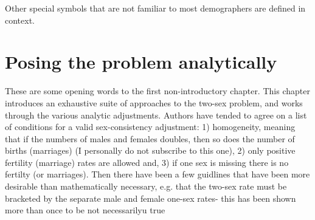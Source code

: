 \documentclass[reqno,12pt,oneside,a4paper]{report} %
\theoremstyle{plain}
\theoremstyle{definition}
\theoremstyle{remark}
\numberwithin{theorem}{chapter}     %
\begin{document}
Other special symbols that are not familiar to most demographers are defined in context.

 \chapter{Posing the problem analytically}
 \label{chap:Posing}
% 
These are some opening words to the first non-introductory chapter. This chapter introduces an exhaustive suite of
 approaches to the two-sex problem, and works through the various analytic adjustments. Authors have tended to agree on a list of conditions for a valid sex-consistency adjustment: 1) homogeneity, meaning that if the numbers of males and females doubles, then so does the number of births (marriages) (I personally do not subscribe to this one), 2) only positive fertility (marriage) rates are allowed and, 3) if one sex is missing there is no fertilty (or marriages). Then there have been a few guidlines that have been more desirable than mathematically necessary, e.g. that the two-sex rate must be bracketed by the separate male and female one-sex rates- this has been shown more than once to be not necessarilyu true \citep{yellin1977comparison}
\end{document}

